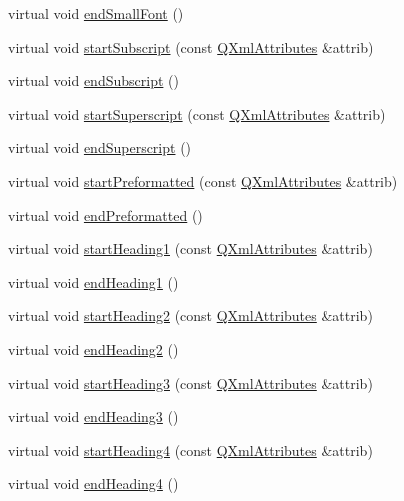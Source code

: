 \begin{DoxyCompactItemize}
\item 
virtual void \hyperlink{class_markup_handler_a80ee62220712713e289593d770b896a8}{end\+Small\+Font} ()
\item 
virtual void \hyperlink{class_markup_handler_aa15c2ef518eec3c545a3b36c47ee1829}{start\+Subscript} (const \hyperlink{class_q_xml_attributes}{Q\+Xml\+Attributes} \&attrib)
\item 
virtual void \hyperlink{class_markup_handler_ad3f41776e690f126f6e11d1d41702e52}{end\+Subscript} ()
\item 
virtual void \hyperlink{class_markup_handler_a9e350d168cdee6d4a228193fedc7614b}{start\+Superscript} (const \hyperlink{class_q_xml_attributes}{Q\+Xml\+Attributes} \&attrib)
\item 
virtual void \hyperlink{class_markup_handler_a470b54b87ea162a849f36e2aa218f55e}{end\+Superscript} ()
\item 
virtual void \hyperlink{class_markup_handler_a19d069d30a4cea68f962055f8fe3a39d}{start\+Preformatted} (const \hyperlink{class_q_xml_attributes}{Q\+Xml\+Attributes} \&attrib)
\item 
virtual void \hyperlink{class_markup_handler_a2bc9b48c59f35ef03c46420c7ccbdf0b}{end\+Preformatted} ()
\item 
virtual void \hyperlink{class_markup_handler_abcdf1202f663ef0951133756678f118a}{start\+Heading1} (const \hyperlink{class_q_xml_attributes}{Q\+Xml\+Attributes} \&attrib)
\item 
virtual void \hyperlink{class_markup_handler_aaeefa2a13a61a726d76927d03d2a4c72}{end\+Heading1} ()
\item 
virtual void \hyperlink{class_markup_handler_a0ffb808feab8f54a140fb72a35e53ebe}{start\+Heading2} (const \hyperlink{class_q_xml_attributes}{Q\+Xml\+Attributes} \&attrib)
\item 
virtual void \hyperlink{class_markup_handler_a98620a47e69a4e624183902316b5806d}{end\+Heading2} ()
\item 
virtual void \hyperlink{class_markup_handler_a485e53a186a3325d8d68ab0afb56c870}{start\+Heading3} (const \hyperlink{class_q_xml_attributes}{Q\+Xml\+Attributes} \&attrib)
\item 
virtual void \hyperlink{class_markup_handler_ad05665b0b5e9bd3caf1a42d1c3236349}{end\+Heading3} ()
\item 
virtual void \hyperlink{class_markup_handler_a1e4e883a6fc9d36f6c2489d2b6904c75}{start\+Heading4} (const \hyperlink{class_q_xml_attributes}{Q\+Xml\+Attributes} \&attrib)
\item 
virtual void \hyperlink{class_markup_handler_a64b4ee63bc504d88c588b3385df619b3}{end\+Heading4} ()

\end{DoxyCompactItemize}
